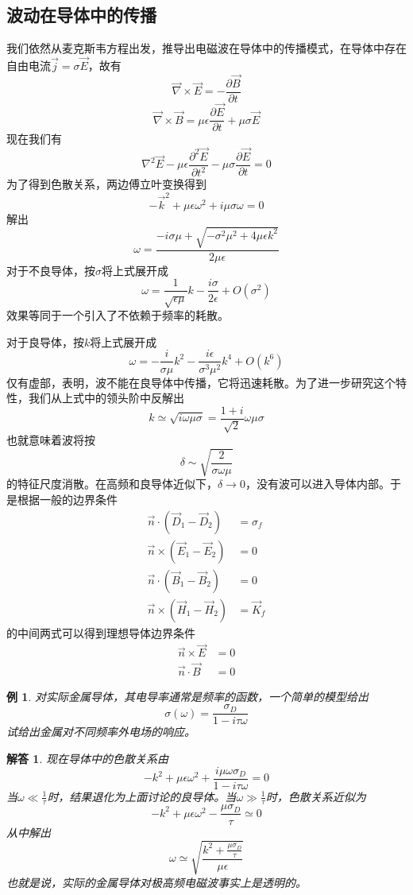 \documentclass[a4paper,11pt]{ctexbook}
\newtheorem{eg}{例}[section]
\newtheorem{ans}{解答}[section]
\newcommand{\beq}{\begin{equation}}
\newcommand{\eeq}{\end{equation}}
\newcommand{\bea}{\begin{equation}\begin{aligned}}
\newcommand{\eea}{\end{aligned}\end{equation}}
\newcommand{\del}{\vec{\nabla}}
\newcommand{\pfrac}[2]{\frac{\partial #1}{\partial #2}}
\begin{document}
\subsection{波动在导体中的传播}
我们依然从麦克斯韦方程出发，推导出电磁波在导体中的传播模式，在导体中存在自由电流$\vec j = \sigma \vec E$，故有
\beq
\del \times \vec E = - \pfrac{\vec B}{t}
\eeq
\beq
\del \times \vec B = \mu \epsilon \pfrac{\vec E }{t} + \mu \sigma \vec E
\eeq
现在我们有
\beq
\nabla^2 \vec E - \mu \epsilon \pfrac{^2 \vec E}{t^2} - \mu \sigma \pfrac{\vec E}{t} = 0
\eeq
为了得到色散关系，两边傅立叶变换得到
\beq
-\vec k^2 + \mu \epsilon \omega^2 + i \mu \sigma \omega = 0
\eeq
解出
\beq
\omega = \frac{-i\sigma \mu + \sqrt{-\sigma^2 \mu^2 + 4\mu \epsilon k^2}}{2\mu \epsilon}
\eeq
对于不良导体，按$\sigma$将上式展开成
\beq
\omega = \frac{1}{\sqrt{\epsilon \mu}} k - \frac{i\sigma}{2\epsilon} + O(\sigma^2)
\eeq
效果等同于一个引入了不依赖于频率的耗散。
\par
对于良导体，按$k$将上式展开成
\beq
\omega = -\frac{i}{\sigma \mu} k^2 - \frac{i \epsilon }{\sigma^3 \mu^2} k^4 + O(k^6)
\eeq
仅有虚部，表明，波不能在良导体中传播，它将迅速耗散。为了进一步研究这个特性，我们从上式中的领头阶中反解出
\beq
k \simeq \sqrt{i\omega \mu \sigma} = \frac{1+i}{\sqrt{2}} \omega \mu \sigma
\eeq
也就意味着波将按
\beq
\delta \sim \sqrt{\frac{2}{\sigma\omega \mu}}
\eeq
的特征尺度消散。在高频和良导体近似下，$\delta \to 0$，没有波可以进入导体内部。于是根据一般的边界条件
\bea
\vec n \cdot (\vec D_1 - \vec D_2) &= \sigma_f \\
\vec n \times (\vec E_1 - \vec E_2)&= 0 \\
\vec n \cdot (\vec B_1 - \vec B_2) &= 0 \\
\vec n \times ( \vec H_1 - \vec H_2) &= \vec K_f
\eea
的中间两式可以得到理想导体边界条件
\bea
\vec n \times \vec E &= 0\\
\vec n \cdot \vec B &= 0
\eea
\begin{eg}
对实际金属导体，其电导率通常是频率的函数，一个简单的模型给出
\beq
\sigma(\omega) = \frac{\sigma_D}{1-i\tau \omega}
\eeq
试给出金属对不同频率外电场的响应。
\end{eg}
\begin{ans}
现在导体中的色散关系由
\beq
-k^2 + \mu \epsilon \omega^2 + \frac{i\mu \omega \sigma_D}{1-i\tau \omega} = 0
\eeq
当$\omega \ll \frac{1}{\tau}$时，结果退化为上面讨论的良导体。当$\omega \gg \frac{1}{\tau}$时，色散关系近似为
\beq
-k^2 + \mu \epsilon \omega^2 - \frac{\mu \sigma_D}{\tau} \simeq 0
\eeq
从中解出
\beq
\omega \simeq \sqrt{\frac{k^2 + \frac{\mu \sigma_D}{\tau}}{\mu \epsilon}}
\eeq
也就是说，实际的金属导体对极高频电磁波事实上是透明的。
\end{ans}
\end{document}

